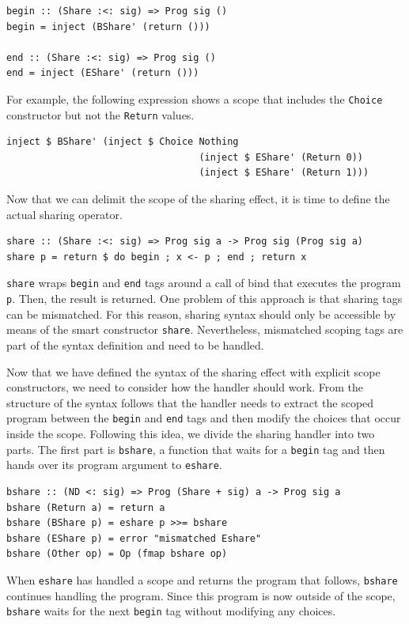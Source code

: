 \documentclass[a4paper, 11pt, fleqn, twoside, abstract=on]{scrreprt}
\newcommand{\hinl}[1]{\texttt{#1}}
\begin{document}
\begin{verbatim}
begin :: (Share :<: sig) => Prog sig ()
begin = inject (BShare' (return ()))

end :: (Share :<: sig) => Prog sig ()
end = inject (EShare' (return ()))
\end{verbatim}
\noindent
For example, the following expression shows a scope that includes the \hinl{Choice} constructor but not the \hinl{Return} values.

\begin{verbatim}
inject $ BShare' (inject $ Choice Nothing 
                                  (inject $ EShare' (Return 0))
                                  (inject $ EShare' (Return 1)))
\end{verbatim}

Now that we can delimit the scope of the sharing effect, it is time to define the actual sharing operator.


\begin{verbatim}
share :: (Share :<: sig) => Prog sig a -> Prog sig (Prog sig a)
share p = return $ do begin ; x <- p ; end ; return x
\end{verbatim}
\noindent
\hinl{share} wraps \hinl{begin} and \hinl{end} tags around a call of bind that executes the program \hinl{p}.
Then, the result is returned.
One problem of this approach is that sharing tags can be mismatched.
For this reason, sharing syntax should only be accessible by means of the smart constructor \hinl{share}.
Nevertheless, mismatched scoping tags are part of the syntax definition and need to be handled.

Now that we have defined the syntax of the sharing effect with explicit scope constructors, we need to consider how the handler should work.
From the structure of the syntax follows that the handler needs to extract the scoped program between the \hinl{begin} and \hinl{end} tags and then modify the choices that occur inside the scope.
Following this idea, we divide the sharing handler into two parts.
The first part is \hinl{bshare}, a function that waits for a \hinl{begin} tag and then hands over its program argument to \hinl{eshare}.

\begin{verbatim}
bshare :: (ND <: sig) => Prog (Share + sig) a -> Prog sig a
bshare (Return a) = return a
bshare (BShare p) = eshare p >>= bshare
bshare (EShare p) = error "mismatched Eshare"
bshare (Other op) = Op (fmap bshare op)
\end{verbatim}
\noindent
When \hinl{eshare} has handled a scope and returns the program that follows, \hinl{bshare} continues handling the program.
Since this program is now outside of the scope, \hinl{bshare} waits for the next \hinl{begin} tag without modifying any choices.
\end{document}
